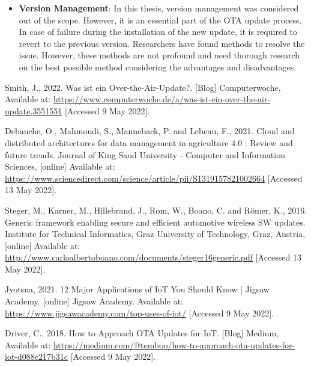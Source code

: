 \documentclass[12pt,a4paper]{article}
\begin{document}
{\begin{itemize}
\item \textbf{Version Management}: In this thesis, version management was considered out of the scope. However, it is an essential part of the OTA update process. In case of failure during the installation of the new update, it is required to revert to the previous version. Researchers have found methods to resolve the issue. However, these methods are not profound and need thorough research on the best possible method considering the advantages and disadvantages.

\end{itemize}



\newpage


\raggedright

\newpage                                                                                %
\begin{thebibliography}{}

Smith, J., 2022. Was ist ein Over-the-Air-Update?. [Blog] Computerwoche, Available at: \url{https://www.computerwoche.de/a/was-ist-ein-over-the-air-update,3551551} [Accessed 9 May 2022]. 

Debauche, O., Mahmoudi, S., Manneback, P. and Lebeau, F., 2021. Cloud and distributed architectures for data management in agriculture 4.0 : Review and future trends. Journal of King Saud University - Computer and Information Sciences, [online] Available at: \url{https://www.sciencedirect.com/science/article/pii/S1319157821002664} [Accessed 13 May 2022].

Steger, M., Karner, M., Hillebrand, J., Rom, W., Boano, C. and Römer, K., 2016. Generic framework enabling secure and efficient automotive wireless SW updates. Institute for Technical Informatics, Graz University of Technology, Graz, Austria, [online] Available at: \url{http://www.carloalbertoboano.com/documents/steger16generic.pdf} [Accessed 13 May 2022].

Jyotsna, 2021. 12 Major Applications of IoT You Should Know | Jigsaw Academy. [online] Jigsaw Academy. Available at: \url{https://www.jigsawacademy.com/top-uses-of-iot/} [Accessed 9 May 2022].

Driver, C., 2018. How to Approach OTA Updates for IoT. [Blog] Medium, Available at: \url{https://medium.com/@temboo/how-to-approach-ota-updates-for-iot-d088c217b31c} [Accessed 9 May 2022].


\end{thebibliography}}
\end{document}
